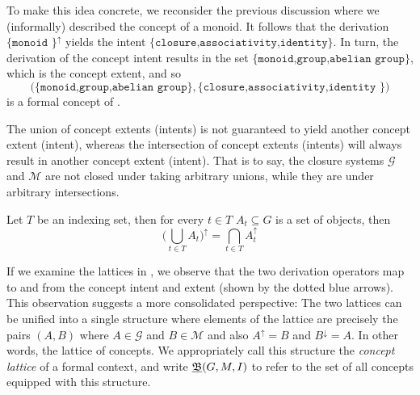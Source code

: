 To make this idea concrete, we reconsider the previous discussion where we (informally) described the concept of a monoid. It follows that the
derivation $\{\texttt{monoid }\}^{\uparrow}$ yields the intent $\{\texttt{closure,associativity,identity}\}$. In turn, the derivation of the
concept intent results in the set $\{\texttt{monoid,group,abelian group}\}$, which is the concept extent, and so
\[
  \big(\{\texttt{monoid,group,abelian group}\}, \{\texttt{closure,associativity,identity }\}\big)
\]
is a formal concept of .

The union of concept extents (intents) is not guaranteed to yield another concept extent (intent), whereas the intersection of concept
extents (intents) will always result in another concept extent (intent). That is to say, the closure systems $\mathcal{G}$ and $\mathcal{M}$
are not closed under taking arbitrary unions, while they are under arbitrary intersections.

\begin{proposition}
  \label{proposition:intersection-union-concepts} Let $T$ be an indexing set, then for every $t \in T$ $A_{t}\subseteq G$ is a set of
  objects, then
  \[
    \big( \underset{t \in T}\bigcup A_{t}\big)^{\uparrow}= \underset{t \in T}\bigcap A_{t}^{\uparrow}
  \]
\end{proposition}

If we examine the lattices in , we observe that the two derivation operators map to and from the concept intent and
extent (shown by the dotted blue arrows). This observation suggests a more consolidated perspective: The two lattices can be unified into a single
structure where elements of the lattice are precisely the pairs $(A,B)$ where $A \in \mathcal{G}$ and $B \in \mathcal{M}$ and also $A^{\uparrow}
= B$ and $B^{\downarrow}= A$. In other words, the lattice of concepts. We appropriately call this structure the \textit{concept lattice} of a
formal context, and write $\underline{{\mathfrak B}} (G,M,\mathrel{I})$ to refer to the set of all concepts equipped with this structure.

